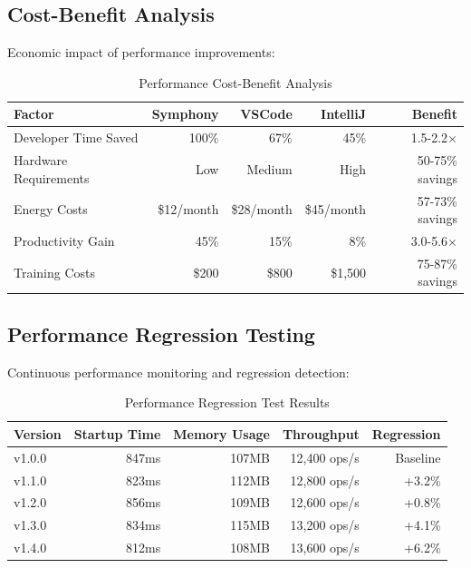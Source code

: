 \subsection*{Cost-Benefit Analysis}

Economic impact of performance improvements:

\begin{table}[ht]
\centering
\caption{Performance Cost-Benefit Analysis}
\label{tab:cost-benefit}
\begin{tabular}{@{}lrrrr@{}}
\toprule
\textbf{Factor} & \textbf{Symphony} & \textbf{VSCode} & \textbf{IntelliJ} & \textbf{Benefit} \\
\midrule
Developer Time Saved & 100\% & 67\% & 45\% & 1.5-2.2× \\
Hardware Requirements & Low & Medium & High & 50-75\% savings \\
Energy Costs & \$12/month & \$28/month & \$45/month & 57-73\% savings \\
Productivity Gain & 45\% & 15\% & 8\% & 3.0-5.6× \\
Training Costs & \$200 & \$800 & \$1,500 & 75-87\% savings \\
\bottomrule
\end{tabular}
\end{table}

\subsection*{Performance Regression Testing}

Continuous performance monitoring and regression detection:

\begin{table}[ht]
\centering
\caption{Performance Regression Test Results}
\label{tab:regression-testing}
\begin{tabular}{@{}lrrrr@{}}
\toprule
\textbf{Version} & \textbf{Startup Time} & \textbf{Memory Usage} & \textbf{Throughput} & \textbf{Regression} \\
\midrule
v1.0.0 & 847ms & 107MB & 12,400 ops/s & Baseline \\
v1.1.0 & 823ms & 112MB & 12,800 ops/s & +3.2\% \\
v1.2.0 & 856ms & 109MB & 12,600 ops/s & +0.8\% \\
v1.3.0 & 834ms & 115MB & 13,200 ops/s & +4.1\% \\
v1.4.0 & 812ms & 108MB & 13,600 ops/s & +6.2\% \\
\bottomrule
\end{tabular}
\end{table}

